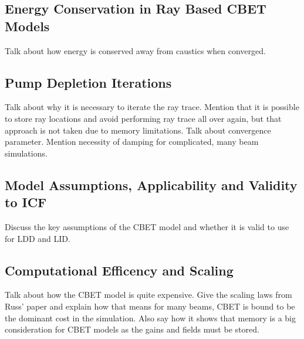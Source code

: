 \subsection{Energy Conservation in Ray Based CBET Models}

Talk about how energy is conserved away from caustics when converged.

\subsection{Pump Depletion Iterations}
\label{sec:pump_dep_iters}

Talk about why it is necessary to iterate the ray trace.
Mention that it is possible to store ray locations and avoid performing ray trace all over again, but that approach is not taken due to memory limitations.
Talk about convergence parameter.
Mention necessity of damping for complicated, many beam simulations.

\subsection{Model Assumptions, Applicability and Validity to ICF}
\label{sec:model_appliciability}

Discuss the key assumptions of the CBET model and whether it is valid to use for LDD and LID.

\subsection{Computational Efficency and Scaling}

Talk about how the CBET model is quite expensive.
Give the scaling laws from Russ' paper and explain how that means for many beams, CBET is bound to be the dominant cost in the simulation.
Also say how it shows that memory is a big consideration for CBET models as the gains and fields must be stored.

